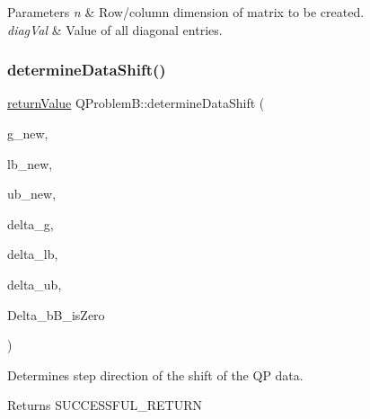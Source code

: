\begin{DoxyParams}{Parameters}
{\em n} & Row/column dimension of matrix to be created. \\
\hline
{\em diag\+Val} & Value of all diagonal entries. \\
\hline
\end{DoxyParams}
\mbox{\label{class_q_problem_b_a47a5f0abd5846f48f5273def9dbfa292}} 
\subsubsection{\texorpdfstring{determine\+Data\+Shift()}{determineDataShift()}}
{\footnotesize\ttfamily \hyperlink{_message_handling_8hpp_a81d556f613bfbabd0b1f9488c0fa865e}{return\+Value} Q\+Problem\+B\+::determine\+Data\+Shift (\begin{DoxyParamCaption}\item[{const \hyperlink{qp_o_a_s_e_s__wrapper_8h_a0d00e2b3dfadee81331bbb39068570c4}{real\+\_\+t} $\ast$const}]{g\+\_\+new,  }\item[{const \hyperlink{qp_o_a_s_e_s__wrapper_8h_a0d00e2b3dfadee81331bbb39068570c4}{real\+\_\+t} $\ast$const}]{lb\+\_\+new,  }\item[{const \hyperlink{qp_o_a_s_e_s__wrapper_8h_a0d00e2b3dfadee81331bbb39068570c4}{real\+\_\+t} $\ast$const}]{ub\+\_\+new,  }\item[{\hyperlink{qp_o_a_s_e_s__wrapper_8h_a0d00e2b3dfadee81331bbb39068570c4}{real\+\_\+t} $\ast$const}]{delta\+\_\+g,  }\item[{\hyperlink{qp_o_a_s_e_s__wrapper_8h_a0d00e2b3dfadee81331bbb39068570c4}{real\+\_\+t} $\ast$const}]{delta\+\_\+lb,  }\item[{\hyperlink{qp_o_a_s_e_s__wrapper_8h_a0d00e2b3dfadee81331bbb39068570c4}{real\+\_\+t} $\ast$const}]{delta\+\_\+ub,  }\item[{\hyperlink{_types_8hpp_a20f82124c82b6f5686a7fce454ef9089}{Boolean\+Type} \&}]{Delta\+\_\+b\+B\+\_\+is\+Zero }\end{DoxyParamCaption})\hspace{0.3cm}{\ttfamily [protected]}}

Determines step direction of the shift of the QP data. \begin{DoxyReturn}{Returns}
S\+U\+C\+C\+E\+S\+S\+F\+U\+L\+\_\+\+R\+E\+T\+U\+RN 
\end{DoxyReturn}

